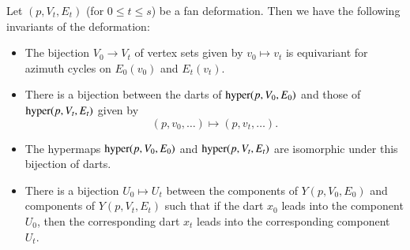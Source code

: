\begin{lemma}  Let $(p,V_t,E_t)$ (for $0\le t\le s$) 
be a fan deformation. Then we have the following invariants
of the deformation:
\begin{itemize}
\item The bijection $V_0\to V_t$ of vertex sets
given by $v_0\mapsto v_t$ 
is equivariant for
azimuth cycles on $E_0(v_0)$ and $E_t(v_t)$.
\item There is a bijection between the darts of ${\operatorname{hyper}}(p,V_0,E_0)$
and those of ${\operatorname{hyper}}(p,V_t,E_t)$ given by
   $$(p,v_0,\ldots) \mapsto (p,v_t,\ldots).$$
\item The hypermaps ${\operatorname{hyper}}(p,V_0,E_0)$ and ${\operatorname{hyper}}(p,V_t,E_t)$
are isomorphic under this bijection of darts.
\item There is a bijection $U_0\mapsto U_t$ 
between the components of $Y(p,V_0,E_0)$
and components of $Y(p,V_t,E_t)$ such that if the dart $x_0$ leads into
the component $U_0$, then the corresponding dart $x_t$ leads into
the corresponding component $U_t$.
\end{itemize}
\end{lemma}

